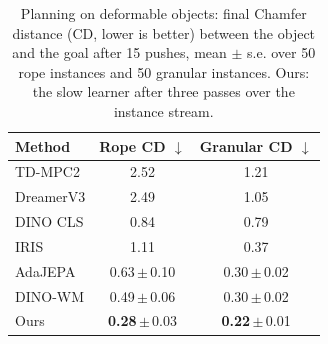 \begin{table}[t]
\centering
\small
\caption{Planning on deformable objects: final Chamfer distance (CD, lower is better) between the object and the goal after 15 pushes, mean $\pm$ s.e. over 50 rope instances and 50 granular instances. Ours: the slow learner after three passes over the instance stream.}
\label{tab:main}
\begin{tabular}{lcc}
\toprule
Method & Rope CD $\downarrow$ & Granular CD $\downarrow$ \\
\midrule
TD-MPC2 & 2.52 & 1.21 \\
DreamerV3 & 2.49 & 1.05 \\
DINO CLS & 0.84 & 0.79 \\
IRIS & 1.11 & 0.37 \\
AdaJEPA & 0.63{\scriptsize\,$\pm$\,0.10} & 0.30{\scriptsize\,$\pm$\,0.02} \\
DINO-WM & 0.49{\scriptsize\,$\pm$\,0.06} & 0.30{\scriptsize\,$\pm$\,0.02} \\
\midrule
Ours & \textbf{0.28}{\scriptsize\,$\pm$\,0.03} & \textbf{0.22}{\scriptsize\,$\pm$\,0.01} \\
\bottomrule
\end{tabular}
\end{table}
